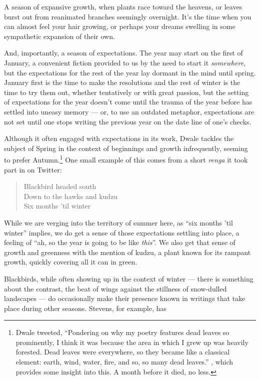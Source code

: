 \documentclass[12pt,oneside]{memoir}
\begin{document}
A season of expansive growth, when plants race toward the heavens, or leaves burst out from reanimated branches seemingly overnight. It's the time when you can almost feel your hair growing, or perhaps your dreams swelling in some sympathetic expansion of their own.

And, importantly, a season of expectations. The year may start on the first of January, a convenient fiction provided to us by the need to start it \emph{somewhere}, but the expectations for the rest of the year lay dormant in the mind until spring. January first is the time to make the resolutions and the rest of winter is the time to try them out, whether tentatively or with great passion, but the setting of expectations for the year doesn't come until the trauma of the year before has settled into uneasy memory --- or, to use an outdated metaphor, expectations are not set until one stops writing the previous year on the date line of one's checks.

Although it often engaged with expectations in its work, Dwale tackles the subject of Spring in the context of beginnings and growth infrequently, seeming to prefer Autumn.\footnote{Dwale tweeted, ``Pondering on why my poetry features dead leaves so prominently, I think it was because the area in which I grew up was heavily forested. Dead leaves were everywhere, so they became like a classical element: earth, wind, water, fire, and so, so many dead leaves.'' \parencite{dwale_leaves_tweet}, which provides some insight into this. A month before it died, no less.} One small example of this comes from a short \emph{renga} it took part in on Twitter:

\begin{verse}
Blackbird headed south\\
Down to the hawks and kudzu\\
Six months 'til winter

\parencite{dwale_haiku}
\end{verse}

While we are verging into the territory of summer here, as ``six months 'til winter'' implies, we do get a sense of those expectations settling into place, a feeling of ``ah, so the year is going to be like \emph{this}''. We also get that sense of growth and greenness with the mention of kudzu, a plant known for its rampant growth, quickly covering all it can in green.

Blackbirds, while often showing up in the context of winter --- there is something about the contrast, the beat of wings against the stillness of snow-dulled landscapes --- do occasionally make their presence known in writings that take place during other seasons. Stevens, for example, has
\end{document}

